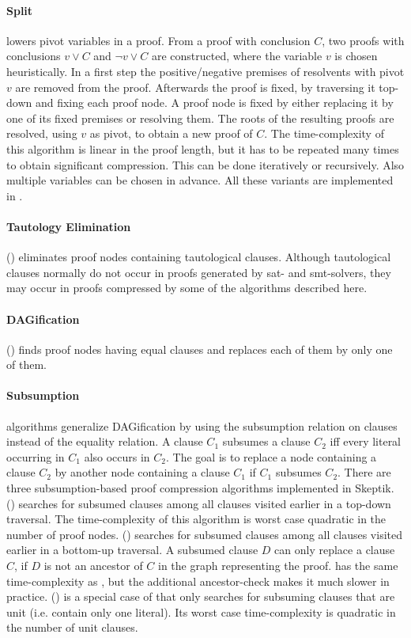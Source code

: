 \documentclass{llncs}
\begin{document}
\paragraph{Split} \cite{CottonSplit} lowers pivot variables in a proof. 
From a proof with conclusion $C$, two proofs with conclusions $v \vee C$ and $\neg{v} \vee C$ are constructed,  where the variable $v$ is chosen heuristically.
In a first step the positive/negative premises of resolvents with pivot $v$ are removed from the proof.
Afterwards the proof is fixed, by traversing it top-down and fixing each proof node.
A proof node is fixed by either replacing it by one of its fixed premises or resolving them.
The roots of the resulting proofs are resolved, using $v$ as pivot, to obtain a new proof of $C$.
The time-complexity of this algorithm is linear in the proof length, but it has to be repeated many times to obtain significant compression. This can be done iteratively or recursively. Also multiple variables can be chosen in advance. 
All these variants are implemented in {\skeptik}.

\paragraph{Tautology Elimination} () eliminates proof nodes containing tautological clauses. Although tautological clauses normally do not occur in proofs generated by sat- and smt-solvers, they may occur in proofs compressed by some of the algorithms described here.


\paragraph{DAGification} () finds proof nodes having equal clauses and replaces each of them by only one of them. 


\paragraph{Subsumption} algorithms generalize DAGification by using the subsumption relation on clauses instead of the equality relation. A clause $C_1$ subsumes a clause $C_2$ iff every literal occurring in $C_1$ also occurs in $C_2$. The goal is to replace a node containing a clause $C_2$ by another node containing a clause $C_1$ if $C_1$ subsumes $C_2$.
There are three subsumption-based proof compression algorithms implemented in Skeptik. 
%
 () searches for subsumed clauses among all clauses visited earlier in a top-down traversal. The time-complexity of this algorithm is worst case quadratic in the number of proof nodes.
%
 () searches for subsumed clauses among all clauses visited earlier in a bottom-up traversal. A subsumed clause $D$ can only replace a clause $C$, if $D$ is not an ancestor of $C$ in the graph representing the proof.  has the same time-complexity as , but the additional ancestor-check makes it much slower in practice.
%
 () \cite{RP11} is a special case of  that only searches for subsuming clauses that are unit (i.e. contain only one literal). Its worst case time-complexity is quadratic in the number of unit clauses.
\end{document}
